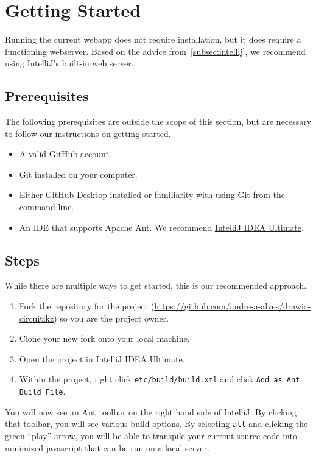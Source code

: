 %
\chapter{Getting Started}\label{ch:getting-started}
Running the current webapp does not require installation, but it does require a functioning webserver.
Based on the advice from~\ref{subsec:intellij}, we recommend using IntelliJ's built-in web server.

\section{Prerequisites}\label{sec:prerequisites}
The following prerequisites are outside the scope of this section, but are necessary to follow our instructions on getting started.
\begin{itemize}
    \item A valid GitHub account.
    \item Git installed on your computer.
    \item Either GitHub Desktop installed or familiarity with using Git from the command line.
    \item An IDE that supports Apache Ant.
        We recommend \href{https://www.jetbrains.com/idea/download/}{IntelliJ IDEA Ultimate}.
\end{itemize}

\section{Steps}\label{sec:getting-started-steps}
While there are multiple ways to get started, this is our recommended approach.
\begin{enumerate}
    \item Fork the repository for the project (\href{https://github.com/andre-a-alves/drawio-circuitikz}{https://github.com/andre-a-alves/drawio-circuitikz}) so you are the project owner.
    \item Clone your new fork onto your local machine.
    \item Open the project in IntelliJ IDEA Ultimate.
    \item Within the project, right click \texttt{etc/build/build.xml} and click \texttt{Add as Ant Build File}.
\end{enumerate}

You will now see an Ant toolbar on the right hand side of IntelliJ.
By clicking that toolbar, you will see various build options.
By selecting \texttt{all} and clicking the green ``play'' arrow, you will be able to transpile your current source code into minimized javascript that can be run on a local server.

